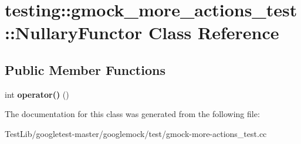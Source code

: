 \hypertarget{classtesting_1_1gmock__more__actions__test_1_1NullaryFunctor}{}\section{testing\+:\+:gmock\+\_\+more\+\_\+actions\+\_\+test\+:\+:Nullary\+Functor Class Reference}
\label{classtesting_1_1gmock__more__actions__test_1_1NullaryFunctor}
\subsection*{Public Member Functions}
\begin{DoxyCompactItemize}
\item 
\mbox{\label{classtesting_1_1gmock__more__actions__test_1_1NullaryFunctor_a50f1e39b9ee381693e8bb871acf4e3a9}} 
int {\bfseries operator()} ()
\end{DoxyCompactItemize}


The documentation for this class was generated from the following file\+:\begin{DoxyCompactItemize}
\item 
Test\+Lib/googletest-\/master/googlemock/test/gmock-\/more-\/actions\+\_\+test.\+cc\end{DoxyCompactItemize}
